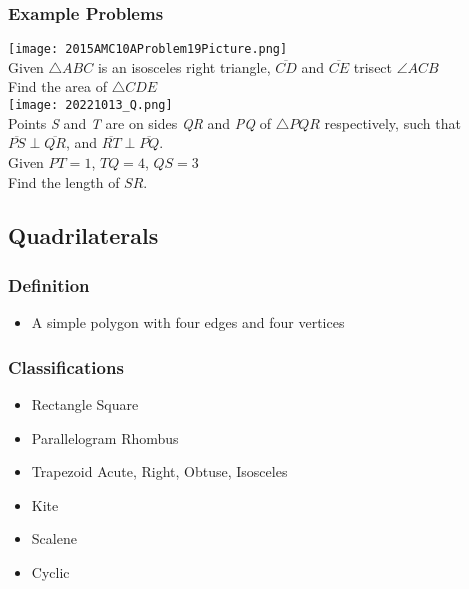 \documentclass{article}
\begin{document}
        \subsubsection{Example Problems}
            \texttt{[image: 2015AMC10AProblem19Picture.png]}\\
            Given $\bigtriangleup ABC$ is an isosceles right triangle, $\overline{CD}$ and $\overline{CE}$ trisect $\angle ACB$\\
            Find the area of $\bigtriangleup CDE$\\
            \texttt{[image: 20221013\_Q.png]}\\
            Points \textit{S} and \textit{T} are on sides \textit{QR} and \textit{PQ} of $\bigtriangleup PQR$ respectively, such that $\overline{PS} \perp \overline{QR}$, and $\overline{RT} \perp \overline{PQ}$.\\
            Given $PT=1$, $TQ=4$, $QS=3$\\
            Find the length of $SR$.

    \subsection{Quadrilaterals}
    
        \subsubsection{Definition}
            \begin{itemize}
                \item A simple polygon with four edges and four vertices
            \end{itemize}
            
        \subsubsection{Classifications}
            \begin{itemize}
                \item Rectangle
                    \subitem Square
                \item Parallelogram
                    \subitem Rhombus
                \item Trapezoid
                    \subitem Acute, Right, Obtuse, Isosceles
                \item Kite
                \item Scalene
                \item Cyclic
            \end{itemize}
\end{document}
